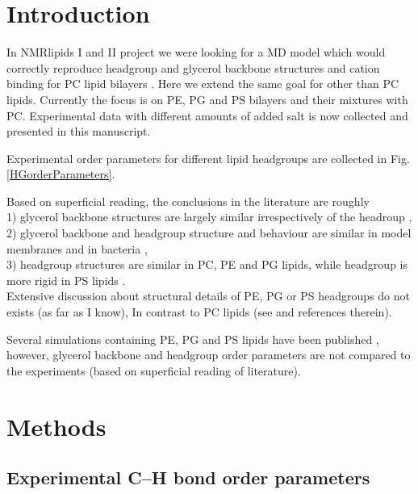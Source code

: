 \documentclass[aps,prl,superscriptaddress,twocolumn]{revtex4}
\begin{document}
\section{Introduction}

In NMRlipids I and II project we were looking for a MD model
which would correctly reproduce headgroup and glycerol
backbone structures and cation binding for PC lipid bilayers \cite{botan15,catte16}.
Here we extend the same goal for other than PC lipids.
Currently the focus is on PE, PG and PS bilayers and their
mixtures with PC. Experimental data with different amounts of 
added salt is now collected and presented in this manuscript.




Experimental order parameters for different lipid headgroups are
collected in Fig. \ref{HGorderParameters}. 

Based on superficial reading, the conclusions in the literature are roughly \\ 
1) glycerol backbone structures are largely similar irrespectively of the headroup \cite{gally81}, \\
2) glycerol backbone and headgroup structure and behaviour are similar in model membranes and in bacteria \cite{gally81,scherer87,seelig90}, \\
3) headgroup structures are similar in PC, PE and PG lipids, while headgroup is more rigid in PS lipids \cite{wohlgemuth80,buldt81}. \\
Extensive discussion about structural details of PE, PG or PS headgroups do not exists (as far as I know), 
In contrast to PC lipids (see \cite{botan15} and references therein).



Several simulations containing PE, PG and PS lipids have been published \cite{??}, 
however, glycerol backbone and headgroup order parameters are not compared to
the experiments (based on superficial reading of literature).

\section{Methods}
\subsection{Experimental C--H bond order parameters}%
\end{document}
